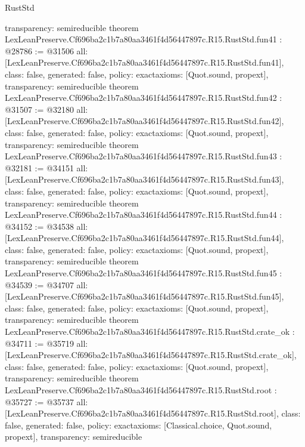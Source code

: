 \begin{lexlean}{RustStd}
\begin{coremodule}
{  transparency: semireducible
}
theorem LexLeanPreserve.Cf696ba2c1b7a80aa3461f4d56447897c.R15.RustStd.fun41 : @28786 := @31506 {
  all: [LexLeanPreserve.Cf696ba2c1b7a80aa3461f4d56447897c.R15.RustStd.fun41],
  class: false,
  generated: false,
  policy: exact{axioms: [Quot.sound, propext]},
  transparency: semireducible
}
theorem LexLeanPreserve.Cf696ba2c1b7a80aa3461f4d56447897c.R15.RustStd.fun42 : @31507 := @32180 {
  all: [LexLeanPreserve.Cf696ba2c1b7a80aa3461f4d56447897c.R15.RustStd.fun42],
  class: false,
  generated: false,
  policy: exact{axioms: [Quot.sound, propext]},
  transparency: semireducible
}
theorem LexLeanPreserve.Cf696ba2c1b7a80aa3461f4d56447897c.R15.RustStd.fun43 : @32181 := @34151 {
  all: [LexLeanPreserve.Cf696ba2c1b7a80aa3461f4d56447897c.R15.RustStd.fun43],
  class: false,
  generated: false,
  policy: exact{axioms: [Quot.sound, propext]},
  transparency: semireducible
}
theorem LexLeanPreserve.Cf696ba2c1b7a80aa3461f4d56447897c.R15.RustStd.fun44 : @34152 := @34538 {
  all: [LexLeanPreserve.Cf696ba2c1b7a80aa3461f4d56447897c.R15.RustStd.fun44],
  class: false,
  generated: false,
  policy: exact{axioms: [Quot.sound, propext]},
  transparency: semireducible
}
theorem LexLeanPreserve.Cf696ba2c1b7a80aa3461f4d56447897c.R15.RustStd.fun45 : @34539 := @34707 {
  all: [LexLeanPreserve.Cf696ba2c1b7a80aa3461f4d56447897c.R15.RustStd.fun45],
  class: false,
  generated: false,
  policy: exact{axioms: [Quot.sound, propext]},
  transparency: semireducible
}
theorem LexLeanPreserve.Cf696ba2c1b7a80aa3461f4d56447897c.R15.RustStd.crate_ok : @34711 := @35719 {
  all: [LexLeanPreserve.Cf696ba2c1b7a80aa3461f4d56447897c.R15.RustStd.crate_ok],
  class: false,
  generated: false,
  policy: exact{axioms: [Quot.sound, propext]},
  transparency: semireducible
}
theorem LexLeanPreserve.Cf696ba2c1b7a80aa3461f4d56447897c.R15.RustStd.root : @35727 := @35737 {
  all: [LexLeanPreserve.Cf696ba2c1b7a80aa3461f4d56447897c.R15.RustStd.root],
  class: false,
  generated: false,
  policy: exact{axioms: [Classical.choice, Quot.sound, propext]},
  transparency: semireducible
}


\end{coremodule}
\end{lexlean}
